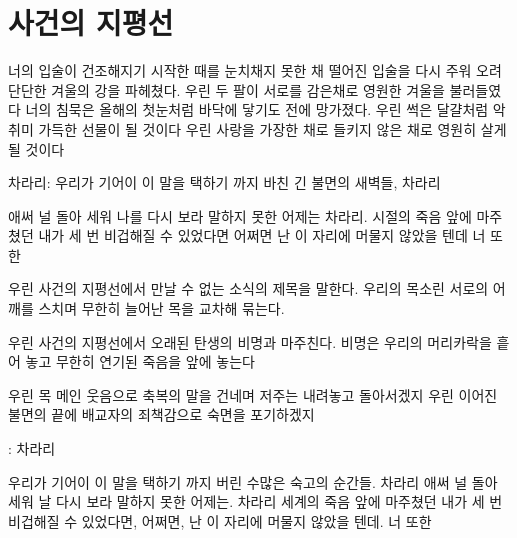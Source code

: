 \documentclass[12pt, b6paper, openany]{memoir}
\newenvironment{lyric}{%
	\setlength{\parindent}{0pt}
}{}
\begin{document}
\begin{lyric}
\hypertarget{uxc0acuxac74uxc758-uxc9c0uxd3c9uxc120}{%

\chapter{사건의 지평선}\label{uxc0acuxac74uxc758-uxc9c0uxd3c9uxc120}}



너의 입술이 건조해지기 시작한 때를 눈치채지 못한 채 떨어진 입술을 다시 주워 오려 단단한 겨울의 강을 파헤쳤다. 우린 두 팔이 서로를 감은채로 영원한 겨울을 불러들였다 너의 침묵은 올해의 첫눈처럼 바닥에 닿기도 전에 망가졌다. 우린 썩은 달걀처럼 악취미 가득한 선물이 될 것이다 우린 사랑을 가장한 채로 들키지 않은 채로 영원히 살게 될 것이다



차라리: 우리가 기어이 이 말을 택하기 까지 바친 긴 불면의 새벽들, 차라리



애써 널 돌아 세워 나를 다시 보라 말하지 못한 어제는 차라리. 시절의 죽음 앞에 마주쳤던 내가 세 번 비겁해질 수 있었다면 어쩌면 난 이 자리에 머물지 않았을 텐데 너 또한



우린 사건의 지평선에서 만날 수 없는 소식의 제목을 말한다. 우리의 목소린 서로의 어깨를 스치며 무한히 늘어난 목을 교차해 묶는다.



우린 사건의 지평선에서 오래된 탄생의 비명과 마주친다. 비명은 우리의 머리카락을 흩어 놓고 무한히 연기된 죽음을 앞에 놓는다



우린 목 메인 웃음으로 축복의 말을 건네며 저주는 내려놓고 돌아서겠지 우린 이어진 불면의 끝에 배교자의 죄책감으로 숙면을 포기하겠지



: 차라리



우리가 기어이 이 말을 택하기 까지 버린 수많은 숙고의 순간들. 차라리 애써 널 돌아 세워 날 다시 보라 말하지 못한 어제는. 차라리 세계의 죽음 앞에 마주쳤던 내가 세 번 비겁해질 수 있었다면, 어쩌면, 난 이 자리에 머물지 않았을 텐데. 너 또한


\end{lyric}
\end{document}
